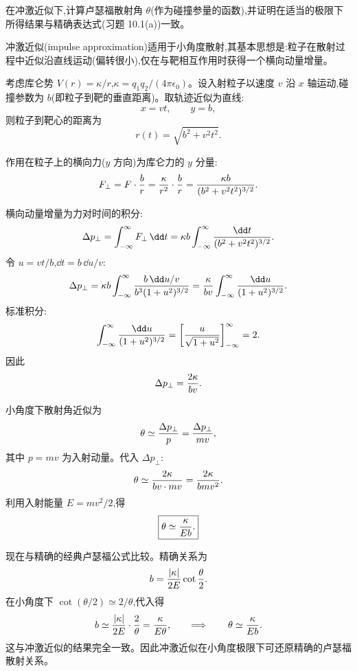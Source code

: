 \begin{question}
在冲激近似下,计算卢瑟福散射角 $\theta$(作为碰撞参量的函数),并证明在适当的极限下所得结果与精确表达式(习题 10.1(a))一致。
\end{question}
\begin{solution}
冲激近似(impulse approximation)适用于小角度散射,其基本思想是:粒子在散射过程中近似沿直线运动(偏转很小),仅在与靶相互作用时获得一个横向动量增量。

考虑库仑势 $V(r)=\kappa/r$,$\kappa=q_1q_2/(4\pi\epsilon_0)$。设入射粒子以速度 $v$ 沿 $x$ 轴运动,碰撞参数为 $b$(即粒子到靶的垂直距离)。取轨迹近似为直线:
\[
x=vt,\qquad y=b,
\]
则粒子到靶心的距离为
\[
r(t)=\sqrt{b^2+v^2t^2}.
\]

作用在粒子上的横向力($y$ 方向)为库仑力的 $y$ 分量:
\[
F_\perp=F\cdot{b\over r}
={\kappa\over r^2}\cdot{b\over r}
={\kappa b\over(b^2+v^2t^2)^{3/2}}.
\]

横向动量增量为力对时间的积分:
\[
\Delta p_\perp=\int_{-\infty}^{\infty}F_\perp\,\dd t
=\kappa b\int_{-\infty}^{\infty}{\dd t\over(b^2+v^2t^2)^{3/2}}.
\]
令 $u=vt/b$,$\dd t=b\,\dd u/v$:
\[
\Delta p_\perp=\kappa b\int_{-\infty}^{\infty}{b\,\dd u/v\over b^3(1+u^2)^{3/2}}
={\kappa\over bv}\int_{-\infty}^{\infty}{\dd u\over(1+u^2)^{3/2}}.
\]
标准积分:
\[
\int_{-\infty}^{\infty}{\dd u\over(1+u^2)^{3/2}}
=\left[{u\over\sqrt{1+u^2}}\right]_{-\infty}^{\infty}=2.
\]
因此
\[
\Delta p_\perp={2\kappa\over bv}.
\]

小角度下散射角近似为
\[
\theta\simeq{\Delta p_\perp\over p}={\Delta p_\perp\over mv},
\]
其中 $p=mv$ 为入射动量。代入 $\Delta p_\perp$:
\[
\theta\simeq{2\kappa\over bv\cdot mv}={2\kappa\over bmv^2}.
\]
利用入射能量 $E=mv^2/2$,得
\[
\boxed{\theta\simeq{\kappa\over Eb}.}
\]

现在与精确的经典卢瑟福公式比较。精确关系为
\[
b={|\kappa|\over2E}\cot{\theta\over2}.
\]
在小角度下 $\cot(\theta/2)\simeq 2/\theta$,代入得
\[
b\simeq{|\kappa|\over2E}\cdot{2\over\theta}={\kappa\over E\theta},
\qquad\Longrightarrow\qquad\theta\simeq{\kappa\over Eb}.
\]
这与冲激近似的结果完全一致。因此冲激近似在小角度极限下可还原精确的卢瑟福散射关系。
\end{solution}

